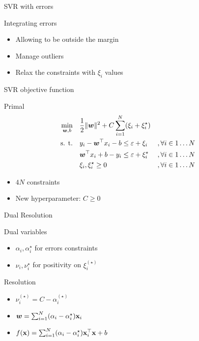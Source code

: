 \documentclass[11pt, pdf, compress, handout]{beamer}
\begin{document}
\begin{frame}{SVR with errors}
  \begin{block}{Integrating errors}
    \begin{itemize}
    \item Allowing to be outside the margin
    \item Manage outliers
    \item Relax the constraints with $\xi_i$ values
    \end{itemize}
  \end{block}
\end{frame}

\begin{frame}[allowframebreaks]{SVR objective function}
  \begin{block}{Primal}
     \begin{equation*}
    \begin{aligned}
      \min_{{\boldsymbol{w}},b}\quad  & \frac{1}{2} \| {\boldsymbol{w}} \|^2 + C \sum_{i=1}^N
      (\xi_i + \xi_i^\star) \\
      \textrm{s. t.}\quad & y_i - {\boldsymbol{w}}^\top x_i - b  \leq \varepsilon + \xi_i&,
      \forall i \in 1\dots N  \\
      &  {\boldsymbol{w}}^\top x_i  + b - y_i  \leq \varepsilon + \xi_i^\star& ,
      \forall i \in 1\dots N  \\
      & \xi_i, \xi_i^\star   \geq 0  & ,
      \forall i \in 1\dots N  
    \end{aligned}
  \end{equation*}
\end{block}
\begin{itemize}
\item $4 N$ constraints
\item New hyperparameter: $C \geq 0$
\end{itemize}
\end{frame}
\begin{frame}{Dual Resolution}
  \begin{block}{Dual variables}
    \begin{itemize}
    \item $\alpha_i, \alpha^\star_i$ for errors constraints
    \item $\nu_i, \nu^\star_i$ for positivity on $\xi_i^{(\star)}$
    \end{itemize}
  \end{block}
  \begin{block}{Resolution}
    \begin{itemize}
    \item $\nu_i^{(\star)} = C - \alpha_i^{(\star)}$
    \item ${\boldsymbol{w}} = \sum_{i=1}^N (\alpha_i - \alpha_i^\star){\mathbf{x}}_i $
    \item $f({\mathbf{x}}) = \sum_{i=1}^N (\alpha_i - \alpha_i^\star){\mathbf{x}}_i^\top
      {\mathbf{x}} +b  $
    \end{itemize}
    
  \end{block}
  
\end{frame}
\end{document}
